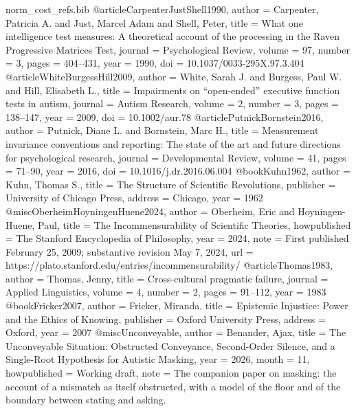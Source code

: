 \begin{filecontents}[overwrite]{norm_cost_refs.bib}
@article{CarpenterJustShell1990,
  author = {Carpenter, Patricia A. and Just, Marcel Adam and Shell, Peter},
  title = {What one intelligence test measures: A theoretical account of the processing in the {Raven} {Progressive} {Matrices} {Test}},
  journal = {Psychological Review}, volume = {97}, number = {3}, pages = {404--431}, year = {1990},
  doi = {10.1037/0033-295X.97.3.404}}
@article{WhiteBurgessHill2009,
  author = {White, Sarah J. and Burgess, Paul W. and Hill, Elisabeth L.},
  title = {Impairments on ``open-ended'' executive function tests in autism},
  journal = {Autism Research}, volume = {2}, number = {3}, pages = {138--147}, year = {2009},
  doi = {10.1002/aur.78}}
@article{PutnickBornstein2016,
  author = {Putnick, Diane L. and Bornstein, Marc H.},
  title = {Measurement invariance conventions and reporting: The state of the art and future directions for psychological research},
  journal = {Developmental Review}, volume = {41}, pages = {71--90}, year = {2016},
  doi = {10.1016/j.dr.2016.06.004}}
@book{Kuhn1962,
  author = {Kuhn, Thomas S.},
  title = {The Structure of Scientific Revolutions},
  publisher = {University of Chicago Press}, address = {Chicago}, year = {1962}}
@misc{OberheimHoyningenHuene2024,
  author = {Oberheim, Eric and Hoyningen-Huene, Paul},
  title = {The Incommensurability of Scientific Theories},
  howpublished = {The Stanford Encyclopedia of Philosophy},
  year = {2024},
  note = {First published February 25, 2009; substantive revision May 7, 2024},
  url = {https://plato.stanford.edu/entries/incommensurability/}}
@article{Thomas1983,
  author = {Thomas, Jenny},
  title = {Cross-cultural pragmatic failure},
  journal = {Applied Linguistics}, volume = {4}, number = {2}, pages = {91--112}, year = {1983}}
@book{Fricker2007,
  author = {Fricker, Miranda},
  title = {Epistemic Injustice: Power and the Ethics of Knowing},
  publisher = {Oxford University Press}, address = {Oxford}, year = {2007}}
@misc{Unconveyable,
  author = {Benander, Ajax},
  title = {The Unconveyable Situation: Obstructed Conveyance, Second-Order Silence, and a Single-Root Hypothesis for Autistic Masking},
  year = {2026}, month = {11},
  howpublished = {Working draft},
  note = {The companion paper on masking: the account of a mismatch as itself obstructed, with a model of the floor and of the boundary between stating and asking.}}
\end{filecontents}
